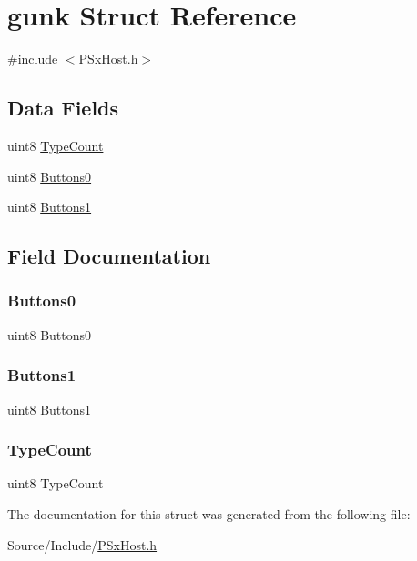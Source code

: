 \hypertarget{structgunk}{}\section{gunk Struct Reference}
\label{structgunk}


{\ttfamily \#include $<$P\+Sx\+Host.\+h$>$}

\subsection*{Data Fields}
\begin{DoxyCompactItemize}
\item 
uint8 \mbox{\hyperlink{structgunk_af8950e4872b4b4b5dd2b837ac45a0603}{Type\+Count}}
\item 
uint8 \mbox{\hyperlink{structgunk_a0d9f38dcaa6d84c7fc78d434b839f259}{Buttons0}}
\item 
uint8 \mbox{\hyperlink{structgunk_a17ebb8fd1844de7d6545c9f96194d300}{Buttons1}}
\end{DoxyCompactItemize}


\subsection{Field Documentation}
\mbox{\label{structgunk_a0d9f38dcaa6d84c7fc78d434b839f259}} 
\subsubsection{\texorpdfstring{Buttons0}{Buttons0}}
{\footnotesize\ttfamily uint8 Buttons0}

\mbox{\label{structgunk_a17ebb8fd1844de7d6545c9f96194d300}} 
\subsubsection{\texorpdfstring{Buttons1}{Buttons1}}
{\footnotesize\ttfamily uint8 Buttons1}

\mbox{\label{structgunk_af8950e4872b4b4b5dd2b837ac45a0603}} 
\subsubsection{\texorpdfstring{Type\+Count}{TypeCount}}
{\footnotesize\ttfamily uint8 Type\+Count}



The documentation for this struct was generated from the following file\+:\begin{DoxyCompactItemize}
\item 
Source/\+Include/\mbox{\hyperlink{_p_sx_host_8h}{P\+Sx\+Host.\+h}}\end{DoxyCompactItemize}
